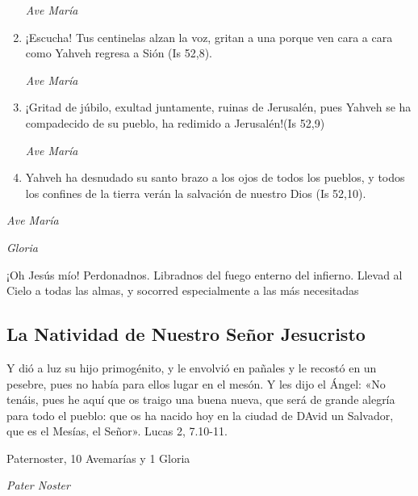 \documentclass[a4paper,11pt, oneside]{report}
\begin{document}
\begin{enumerate}
          \textit{Ave María}

          \item ¡Escucha! Tus centinelas alzan la voz, gritan a una porque ven cara a cara como Yahveh regresa a Sión (Is 52,8).
          
          \textit{Ave María}

          \item ¡Gritad de júbilo, exultad juntamente, ruinas de Jerusalén, pues Yahveh se ha compadecido de su pueblo, ha redimido a Jerusalén!(Is 52,9)
          
          \textit{Ave María}

          \item Yahveh ha desnudado su santo brazo a los ojos de todos los pueblos, y todos los confines de la tierra verán la salvación de nuestro Dios (Is 52,10).

        \end{enumerate}

        \textit{Ave María} \par
        \indent\textit{Gloria} \par
        
        \medskip
        ¡Oh Jesús mío! Perdonadnos. Libradnos del fuego enterno del infierno. Llevad al Cielo a todas las almas, y socorred especialmente a las más 
        necesitadas
                      
      \subsection*{La Natividad de Nuestro Señor Jesucristo}
        Y dió a luz su hijo primogénito, y le envolvió en pañales y le recostó en un pesebre, pues no había para ellos lugar en el mesón.
        Y les dijo el Ángel: «No tenáis, pues he aquí que os traigo una buena nueva, que será de grande alegría para todo el pueblo: que os ha nacido hoy en la ciudad de DAvid
        un Salvador, que es el Mesías, el Señor». Lucas 2, 7.10-11.
        
         Paternoster, 10 Avemarías y 1 Gloria
        
                \textit{Pater Noster} 
\end{document}
